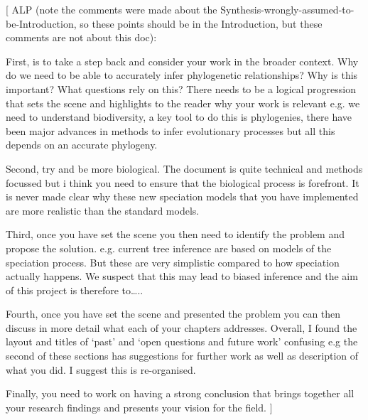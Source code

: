 [
  ALP (note the comments were made about the 
  Synthesis-wrongly-assumed-to-be-Introduction, so these points should be in the
  Introduction, but these comments are not about this doc):

  First, is to take a step back and consider your work in the broader context. 
  Why do we need to be able to accurately infer phylogenetic relationships? 
  Why is this important? What questions rely on this? 
  There needs to be a logical progression 
  that sets the scene and highlights to the reader 
  why your work is relevant e.g. we need to understand biodiversity, 
  a key tool to do this is phylogenies, 
  there have been major advances in methods to infer evolutionary processes 
  but all this depends on an accurate phylogeny.

  Second, try and be more biological. 
  The document is quite technical and methods focussed 
  but i think you need to ensure that the biological process is forefront. 
  It is never made clear why these new speciation models 
  that you have implemented are more realistic than the standard models.

  Third, once you have set the scene you then need to identify 
  the problem and propose the solution. e.g. current tree inference 
  are based on models of the speciation process. 
  But these are very simplistic compared to how speciation actually happens. 
  We suspect that this may lead to biased inference and the aim of this project is therefore to…..

  Fourth, once you have set the scene and presented 
  the problem you can then discuss in more detail what 
  each of your chapters addresses. Overall, I found the layout and 
  titles of ‘past’ and ‘open questions and future work’ confusing 
  e.g the second of these sections has suggestions for further work 
  as well as description of what you did. I suggest this is re-organised.

  Finally, you need to work on having a strong conclusion that brings together all your research findings and presents your vision for the field.
]